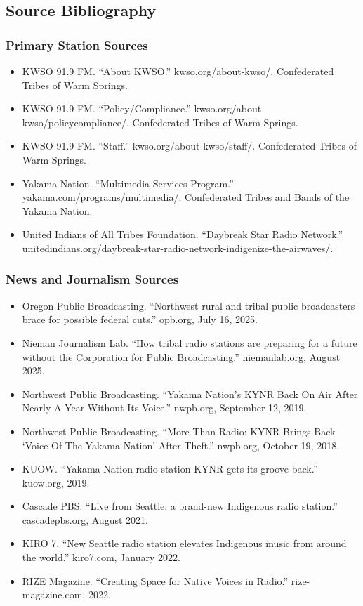 \documentclass[11pt,letterpaper]{article}
\begin{document}
\subsection{Source Bibliography}

\subsubsection{Primary Station Sources}
\begin{itemize}[leftmargin=2em]
  \item KWSO 91.9 FM. ``About KWSO.'' kwso.org/about-kwso/. Confederated Tribes of Warm Springs.
  \item KWSO 91.9 FM. ``Policy/Compliance.'' kwso.org/about-kwso/policycompliance/. Confederated Tribes of Warm Springs.
  \item KWSO 91.9 FM. ``Staff.'' kwso.org/about-kwso/staff/. Confederated Tribes of Warm Springs.
  \item Yakama Nation. ``Multimedia Services Program.'' yakama.com/programs/multimedia/. Confederated Tribes and Bands of the Yakama Nation.
  \item United Indians of All Tribes Foundation. ``Daybreak Star Radio Network.'' unitedindians.org/daybreak-star-radio-network-indigenize-the-airwaves/.
\end{itemize}

\subsubsection{News and Journalism Sources}
\begin{itemize}[leftmargin=2em]
  \item Oregon Public Broadcasting. ``Northwest rural and tribal public broadcasters brace for possible federal cuts.'' opb.org, July 16, 2025.
  \item Nieman Journalism Lab. ``How tribal radio stations are preparing for a future without the Corporation for Public Broadcasting.'' niemanlab.org, August 2025.
  \item Northwest Public Broadcasting. ``Yakama Nation's KYNR Back On Air After Nearly A Year Without Its Voice.'' nwpb.org, September 12, 2019.
  \item Northwest Public Broadcasting. ``More Than Radio: KYNR Brings Back `Voice Of The Yakama Nation' After Theft.'' nwpb.org, October 19, 2018.
  \item KUOW. ``Yakama Nation radio station KYNR gets its groove back.'' kuow.org, 2019.
  \item Cascade PBS. ``Live from Seattle: a brand-new Indigenous radio station.'' cascadepbs.org, August 2021.
  \item KIRO 7. ``New Seattle radio station elevates Indigenous music from around the world.'' kiro7.com, January 2022.
  \item RIZE Magazine. ``Creating Space for Native Voices in Radio.'' rize-magazine.com, 2022.
\end{itemize}
\end{document}
